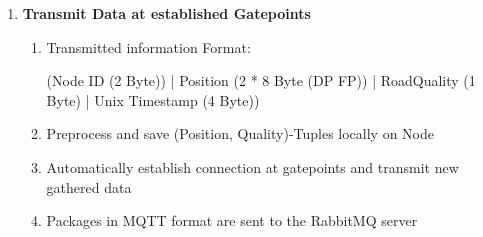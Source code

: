 \begin{enumerate}
    \item \textbf{Transmit Data at established Gatepoints}
       \begin{enumerate}
       \item Transmitted information Format:
       
          (Node ID (2 Byte)) | Position (2 * 8 Byte (DP FP)) | RoadQuality (1 Byte) | Unix Timestamp (4 Byte))
       \item Preprocess and save (Position, Quality)-Tuples locally on Node
       \item Automatically establish connection at gatepoints and transmit new gathered data
       \item Packages in MQTT format are sent to the RabbitMQ server
       \end{enumerate}
    \end{enumerate}